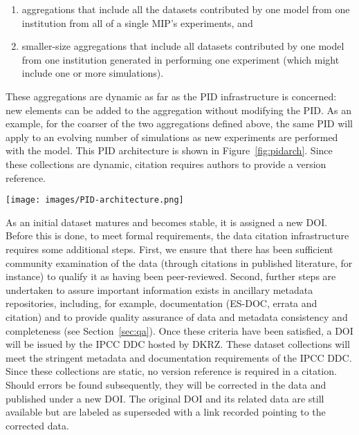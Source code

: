 \documentclass[gmd,manuscript]{copernicus}
\begin{document}
\begin{enumerate}
\item aggregations that include all the datasets contributed by one
  model from one institution from all of a single MIP's experiments,
  and
\item smaller-size aggregations that include all datasets contributed
  by one model from one institution generated in performing one
  experiment (which might include one or more simulations).
\end{enumerate}

These aggregations are dynamic as far as the PID infrastructure is
concerned: new elements can be added to the aggregation without
modifying the PID. As an example, for the coarser of the two
aggregations defined above, the same PID will apply to an evolving
number of simulations as new experiments are performed with the model.
This PID architecture is shown in Figure~\ref{fig:pidarch}. Since
these collections are dynamic, citation requires authors to provide a
version reference.

\begin{figure*}
  \begin{center}
    \texttt{[image: images/PID-architecture.png]}
  \end{center}
  \caption{Schematic PID architecture, showing layers in the PID
    hierarchy. In the lower layers of the hierarchy, PIDs are static
    once generated, and new datasets generate new versions with new
    PIDs. Each file carries a PID and each collection (dataset,
    simulation, ..) is related to a PID. Resolving the PID in the
    Handle server guides the user to the file or the landing page
    describing the collection. Each box in the figure will be
    addressed uniquely by its PID.}
  \label{fig:pidarch}
\end{figure*}

As an initial dataset matures and becomes stable, it is assigned a new
DOI. Before this is done, to meet formal requirements, the data
citation infrastructure requires some additional steps. First, we
ensure that there has been sufficient community examination of the
data (through citations in published literature, for instance) to
qualify it as having been peer-reviewed. Second, further steps are
undertaken to assure important information exists in ancillary
metadata repositories, including, for example, documentation (ES-DOC,
errata and citation) and to provide quality assurance of data and
metadata consistency and completeness (see Section~\ref{sec:qa}). Once
these criteria have been satisfied, a DOI will be issued by the IPCC
DDC hosted by DKRZ. These dataset collections will meet the stringent
metadata and documentation requirements of the IPCC DDC. Since these
collections are static, no version reference is required in a
citation. Should errors be found subsequently, they will be corrected
in the data and published under a new DOI. The original DOI and its
related data are still available but are labeled as superseded with a
link recorded pointing to the corrected data.
\end{document}
